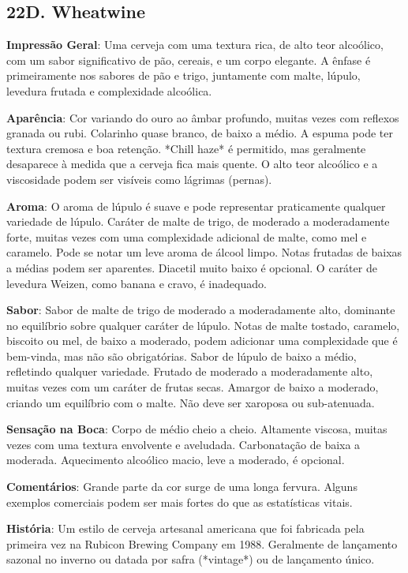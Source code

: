\subsection*{22D. Wheatwine}

\textbf{Impressão Geral}: Uma cerveja com uma textura rica, de alto teor alcoólico, com um sabor significativo de pão, cereais, e um corpo elegante. A ênfase é primeiramente nos sabores de pão e trigo, juntamente com malte, lúpulo, levedura frutada e complexidade alcoólica.

\textbf{Aparência}: Cor variando do ouro ao âmbar profundo, muitas vezes com reflexos granada ou rubi. Colarinho quase branco, de baixo a médio. A espuma pode ter textura cremosa e boa retenção. *Chill haze* é permitido, mas geralmente desaparece à medida que a cerveja fica mais quente. O alto teor alcoólico e a viscosidade podem ser visíveis como lágrimas (pernas).

\textbf{Aroma}: O aroma de lúpulo é suave e pode representar praticamente qualquer variedade de lúpulo. Caráter de malte de trigo, de moderado a moderadamente forte, muitas vezes com uma complexidade adicional de malte, como mel e caramelo. Pode se notar um leve aroma de álcool limpo. Notas frutadas de baixas a médias podem ser aparentes. Diacetil muito baixo é opcional. O caráter de levedura Weizen, como banana e cravo, é inadequado.

\textbf{Sabor}: Sabor de malte de trigo de moderado a moderadamente alto, dominante no equilíbrio sobre qualquer caráter de lúpulo. Notas de malte tostado, caramelo, biscoito ou mel, de baixo a moderado, podem adicionar uma complexidade que é bem-vinda, mas não são obrigatórias. Sabor de lúpulo de baixo a médio, refletindo qualquer variedade. Frutado de moderado a moderadamente alto, muitas vezes com um caráter de frutas secas. Amargor de baixo a moderado, criando um equilíbrio com o malte. Não deve ser xaroposa ou sub-atenuada.

\textbf{Sensação na Boca}: Corpo de médio cheio a cheio. Altamente viscosa, muitas vezes com uma textura envolvente e aveludada. Carbonatação de baixa a moderada. Aquecimento alcoólico macio, leve a moderado, é opcional.

\textbf{Comentários}: Grande parte da cor surge de uma longa fervura. Alguns exemplos comerciais podem ser mais fortes do que as estatísticas vitais.

\textbf{História}: Um estilo de cerveja artesanal americana que foi fabricada pela primeira vez na Rubicon Brewing Company em 1988. Geralmente de lançamento sazonal no inverno ou datada por safra (*vintage*) ou de lançamento único.

